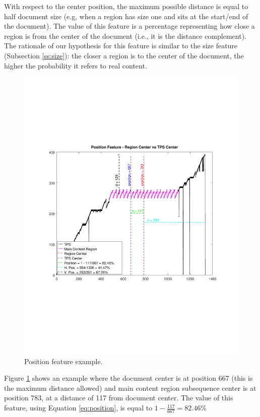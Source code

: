 With respect to the center position, the maximum possible distance is equal to
half document size (e.g, when a region has size one and sits at the start/end of
the document). The value of this feature is a percentage representing how close
a region is from the center of the document (i.e., it is the distance
complement). The rationale of our hypothesis for this feature is similar to the
size feature (Subsection \ref{ss:size}): the closer a region is to the center of the
document, the higher the probability it refers to real content.

\begin{figure}[h]
  \centering
     \includegraphics[trim={2.5cm 7.4cm 2.2cm 7.4cm}, clip,  width=\columnwidth]{img/position.pdf}
  \caption{Position feature example.}
  \label{fig:position}
\end{figure}

Figure \ref{fig:position} shows an example where the document center is at
position 667 (this is the maximum distance allowed) and main content region
subsequence center is at position 783, at a distance of 117 from document
center. The value of this feature, using Equation \ref{eq:position}, is equal to
$1- \frac{117}{667} = 82.46\%$

